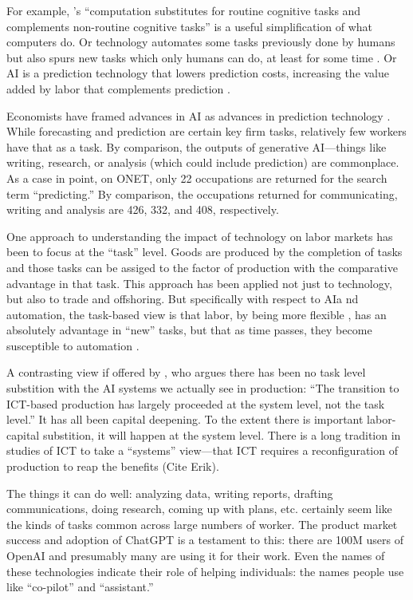 \documentclass{article}
\begin{document}
For example, \cite{autor2003skill}'s ``computation substitutes for routine cognitive tasks and complements non-routine cognitive tasks'' is a useful simplification of what computers do. 
Or technology automates some tasks previously done by humans but also spurs new tasks which only humans can do, at least for some time \citep{acemoglu2019}. 
Or AI is a prediction technology that lowers prediction costs, increasing the value added by labor that complements prediction \citep{agrawal2019}. 

Economists have framed advances in AI as advances in prediction technology \citep{agrawal2019}.
While forecasting and prediction are certain key firm tasks, relatively few workers have that as a task. 
By comparison, the outputs of generative AI---things like writing, research, or analysis (which could include prediction) are commonplace. 
As a case in point, on ONET, only 22 occupations are returned for the search term ``predicting.'' 
By comparison, the occupations returned for communicating, writing and analysis are 426, 332, and 408, respectively. 

One approach to understanding the impact of technology on labor markets has been to focus at the ``task'' level.
Goods are produced by the completion of tasks and those tasks can be assiged to the factor of production with the comparative advantage in that task.
This approach has been applied not just to technology, but also to trade and offshoring.
But specifically with respect to AIa nd automation, the task-based view is that labor, by being more flexible \citep{acemoglu2011skills}, has an absolutely advantage in ``new'' tasks, but that as time passes, they become susceptible to automation \citep{acemoglu2018}.


A contrasting view if offered by \cite{bresnahan2020artificial}, who argues there has been no task level substition with the AI systems we actually see in production: ``The transition to ICT-based production has largely proceeded at the system level, not the task level.''
It has all been capital deepening.
To the extent there is important labor-capital substition, it will happen at the system level.
There is a long tradition in studies of ICT to take a ``systems'' view---that ICT requires a reconfiguration of production to reap the benefits (Cite Erik).

The things it can do well: analyzing data, writing reports, drafting communications, doing research, coming up with plans, etc. certainly seem like the kinds of tasks common across large numbers of worker.
The product market success and adoption of ChatGPT is a testament to this: there are 100M users of OpenAI and presumably many are using it for their work.
Even the names of these technologies indicate their role of helping individuals: the names people use like ``co-pilot'' and ``assistant.'' 
\end{document}
